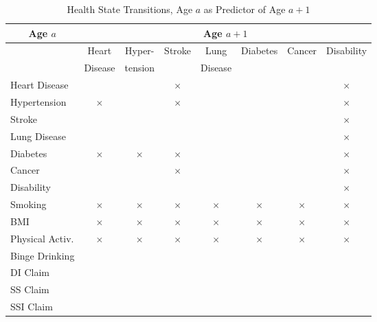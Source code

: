 \documentclass[static]{JJH-Beamer}
\begin{document}
\clearpage
\begin{frame}

\begin{table}[H]
\caption{Health State Transitions, Age $a$ as Predictor of Age $a+1$}\label{table:transition}
\begin{center}
\begin{tabular}{l|ccccccc} \toprule
\multicolumn{1}{c}{Age $a$} & \multicolumn{7}{c}{Age $a+1$} \\ \midrule
  & Heart & Hyper- & Stroke & Lung  & Diabetes & Cancer & Disability \\
&  Disease & tension &  & Disease & & & \\
Heart Disease & & & $\times$& & & &$\times$ \\
Hypertension  &  $\times$& & $\times$ & & & &$\times$ \\
Stroke           & & & & & & &$\times$ \\
Lung Disease & & & & & & &$\times$ \\
Diabetes       & $\times$ &$\times$  & $\times$   & & & &$\times$ \\
Cancer         & & & $\times$ &  & &   &$\times$ \\
Disability     & & & & & & &$\times$ \\
\midrule
Smoking & $\times$& $\times$ & $\times$ & $\times$& $\times$& $\times$&$\times$ \\
BMI & $\times$& $\times$&$\times$ & $\times$& $\times$& $\times$&$\times$ \\
Physical Activ. & $\times$& $\times$&$\times$ & $\times$& $\times$& $\times$&$\times$ \\
Binge Drinking & & & & & & &  \\
\midrule
DI Claim      & & & & &  & & \\
SS Claim     & & & & & & & \\
SSI Claim   & & & & & & & \\ \bottomrule
\end{tabular}
\end{center}
\end{table}

\end{frame}
\end{document}
